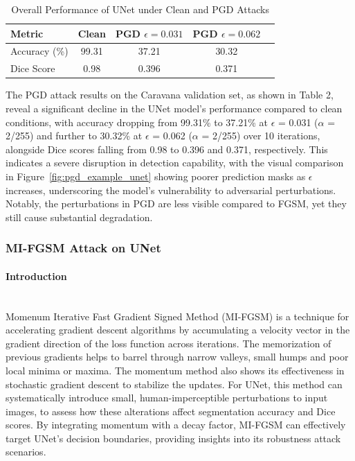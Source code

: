 \documentclass[../main.tex]{subfiles}
\begin{document}
\begin{table}[H]
\caption{Overall Performance of UNet under Clean and PGD Attacks}
    \label{tab:unet_pgd_overall_performance}
    \centering
    \footnotesize
    \begin{tabular}{@{\hspace{0.3cm}}lS[table-format=1.3]S[table-format=1.3]S[table-format=1.3]S[table-format=1.3]@{\hspace{0.3cm}}}
        \toprule
        \textbf{Metric} & {\textbf{Clean}} & {\textbf{PGD $\epsilon=0.031$}} & {\textbf{PGD $\epsilon=0.062$}}  \\
        \midrule
        Accuracy (\%)    & 99.31 & 37.21 & 30.32 \\
        Dice Score        & 0.98 & 0.396 & 0.371  \\
        \bottomrule
    \end{tabular}
\end{table}
The PGD attack results on the Caravana validation set, as shown in Table 2, reveal a significant decline in the UNet model's performance compared to clean conditions, with accuracy dropping from 99.31\% to 37.21\% at $\epsilon$ = 0.031 ($\alpha$ = 2/255) and further to 30.32\% at $\epsilon$ = 0.062 ($\alpha$ = 2/255) over 10 iterations, alongside Dice scores falling from 0.98 to 0.396 and 0.371, respectively. This indicates a severe disruption in detection capability, with the visual comparison in Figure~\ref{fig:pgd_example_unet} showing poorer prediction masks as $\epsilon$ increases, underscoring the model's vulnerability to adversarial perturbations. Notably, the perturbations in PGD are less visible compared to FGSM, yet they still cause substantial degradation.


\subsubsection{MI-FGSM Attack on UNet}
\paragraph{Introduction}\leavevmode\\
Momenum Iterative Fast Gradient Signed Method (MI-FGSM) \cite{dong2018momentum} is a technique for accelerating gradient descent algorithms by accumulating a velocity vector in the gradient direction of the loss function across iterations. The memorization of previous gradients helps to barrel through narrow valleys, small humps and poor local minima or maxima. The momentum method also shows its effectiveness in stochastic gradient descent to stabilize the updates. For UNet, this method can systematically introduce small, human-imperceptible perturbations to input images, to assess how these alterations affect segmentation accuracy and Dice scores. By integrating momentum with a decay factor, MI-FGSM can effectively target UNet's decision boundaries, providing insights into its robustness attack scenarios.
\end{document}
